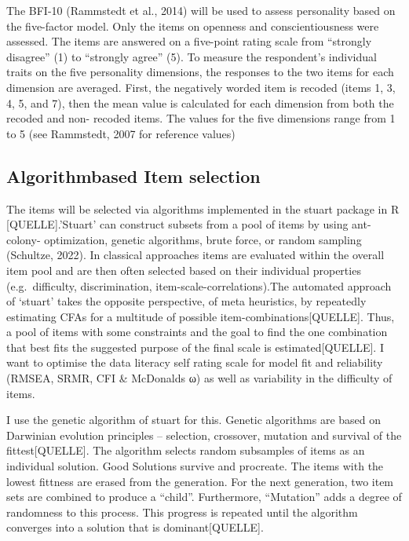 \documentclass[
  12pt,
  a4paper,
  twoside]{article}
\begin{document}
The BFI-10 (Rammstedt et al., 2014) will be used to assess personality
based on the five-factor model. Only the items on openness and
conscientiousness were assessed. The items are answered on a five-point
rating scale from ``strongly disagree'' (1) to ``strongly agree'' (5).
To measure the respondent's individual traits on the five personality
dimensions, the responses to the two items for each dimension are
averaged. First, the negatively worded item is recoded (items 1, 3, 4,
5, and 7), then the mean value is calculated for each dimension from
both the recoded and non- recoded items. The values for the five
dimensions range from 1 to 5 (see Rammstedt, 2007 for reference values)

\subsection{Algorithmbased Item
selection}\label{algorithmbased-item-selection}

The items will be selected via algorithms implemented in the stuart
package in R {[}QUELLE{]}.'Stuart' can construct subsets from a pool of
items by using ant-colony- optimization, genetic algorithms, brute
force, or random sampling (Schultze, 2022). In classical approaches
items are evaluated within the overall item pool and are then often
selected based on their individual properties (e.g.~difficulty,
discrimination, item-scale-correlations).The automated approach of
`stuart' takes the opposite perspective, of meta heuristics, by
repeatedly estimating CFAs for a multitude of possible
item-combinations{[}QUELLE{]}. Thus, a pool of items with some
constraints and the goal to find the one combination that best fits the
suggested purpose of the final scale is estimated{[}QUELLE{]}. I want to
optimise the data literacy self rating scale for model fit and
reliability (RMSEA, SRMR, CFI \& McDonalds ω) as well as variability in
the difficulty of items.

I use the genetic algorithm of stuart for this. Genetic algorithms are
based on Darwinian evolution principles -- selection, crossover,
mutation and survival of the fittest{[}QUELLE{]}. The algorithm selects
random subsamples of items as an individual solution. Good Solutions
survive and procreate. The items with the lowest fittness are erased
from the generation. For the next generation, two item sets are combined
to produce a ``child''. Furthermore, ``Mutation'' adds a degree of
randomness to this process. This progress is repeated until the
algorithm converges into a solution that is dominant{[}QUELLE{]}.
\end{document}

